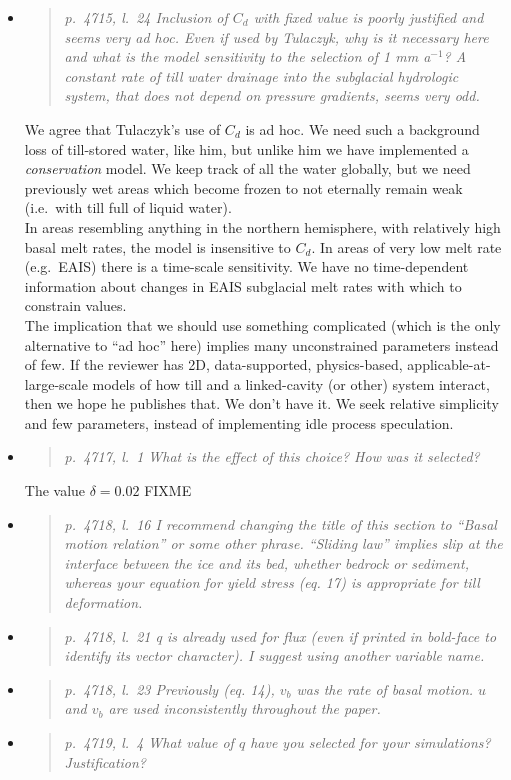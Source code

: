 \documentclass[11pt,reqno]{amsart}
\newcommand{\reply}[2]{
\medskip\medskip
\item  \begin{quote}
\emph{#1}
\end{quote}

\medskip
\noindent #2}
\begin{document}
\begin{itemize}
\reply{p.~4715, l.~24 Inclusion of $C_d$ with fixed value is poorly justified and seems very ad hoc.  Even if used by Tulaczyk, why is it necessary here and what is the model sensitivity to the selection of 1 mm a$^{-1}$?  A constant rate of till water drainage into the subglacial hydrologic system, that does not depend on pressure gradients, seems very odd.}
{We agree that Tulaczyk's use of $C_d$ is ad hoc.  We need such a background loss of till-stored water, like him, but unlike him we have implemented a \emph{conservation} model.  We keep track of all the water globally, but we need previously wet areas which become frozen to not eternally remain weak (i.e.~with till full of liquid water).\\
\indent In areas resembling anything in the northern hemisphere, with relatively high basal melt rates, the model is insensitive to $C_d$.  In areas of very low melt rate (e.g.~EAIS) there is a time-scale sensitivity.  We have no time-dependent information about changes in EAIS subglacial melt rates with which to constrain values. \\
\indent The implication that we should use something complicated (which is the only alternative to ``ad hoc'' here) implies many unconstrained parameters instead of few.   If the reviewer has 2D, data-supported, physics-based, applicable-at-large-scale models of how till and a linked-cavity (or other) system interact, then we hope he publishes that.  We don't have it.  We seek relative simplicity and few parameters, instead of implementing idle process speculation.}

\reply{p.~4717, l.~1 What is the effect of this choice? How was it selected?}
{The value $\delta=0.02$ FIXME}

\reply{p.~4718, l.~16 I recommend changing the title of this section to ``Basal motion relation''
or some other phrase. ``Sliding law'' implies slip at the interface between the ice and its
bed, whether bedrock or sediment, whereas your equation for yield stress (eq. 17) is
appropriate for till deformation.}
{}

\reply{p.~4718, l.~21 q is already used for flux (even if printed in bold-face to identify its vector
character). I suggest using another variable name.}
{}

\reply{p.~4718, l.~23 Previously (eq. 14), $v_b$ was the rate of basal motion. $u$ and $v_b$ are
used inconsistently throughout the paper.}
{}

\reply{p.~4719, l.~4 What value of $q$ have you selected for your simulations? Justification?}
{}


\end{itemize}
\end{document}
